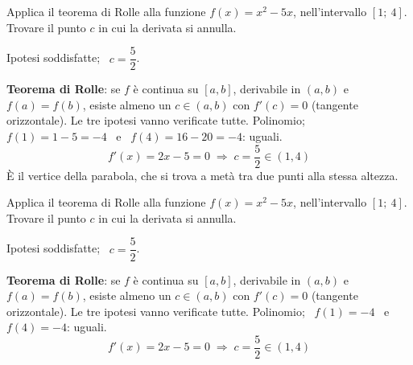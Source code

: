 
\begin{question}[ID=1.5, subtitle={Teorema di Rolle per $f(x)=x^2-5x$ su $[1,4]$}, tags={rolle, teoremi}, difficulty=facile]
Applica il teorema di Rolle alla funzione \(f(x) = x^2 - 5x\), nell'intervallo \([1;\ 4]\). Trovare il punto \(c\) in cui la derivata si annulla.
\begin{solution}
Ipotesi soddisfatte; \ $c=\dfrac52$.
\end{solution}
\begin{explanation}
\textbf{Teorema di Rolle}: se $f$ è continua su $[a,b]$, derivabile in $(a,b)$ e $f(a)=f(b)$, esiste almeno un $c\in(a,b)$ con $f'(c)=0$ (tangente orizzontale). Le tre ipotesi vanno verificate tutte.
Polinomio; \ $f(1)=1-5=-4$ \ e \ $f(4)=16-20=-4$: uguali.
\[ f'(x)=2x-5=0 \;\Rightarrow\; c=\dfrac52\in(1,4) \]
È il vertice della parabola, che si trova a metà tra due punti alla stessa altezza.
\end{explanation}
\end{question}


\begin{question}[ID=1.6, subtitle={Teorema di Rolle per $f(x)=x^2-5x$ su $[1,4]$ — variante}, tags={rolle, teoremi}, difficulty=facile]
Applica il teorema di Rolle alla funzione \(f(x) = x^2 - 5x\), nell'intervallo \([1;\ 4]\). Trovare il punto \(c\) in cui la derivata si annulla.
\begin{solution}
Ipotesi soddisfatte; \ $c=\dfrac52$.
\end{solution}
\begin{explanation}
\textbf{Teorema di Rolle}: se $f$ è continua su $[a,b]$, derivabile in $(a,b)$ e $f(a)=f(b)$, esiste almeno un $c\in(a,b)$ con $f'(c)=0$ (tangente orizzontale). Le tre ipotesi vanno verificate tutte.
Polinomio; \ $f(1)=-4$ \ e \ $f(4)=-4$: uguali.
\[ f'(x)=2x-5=0 \;\Rightarrow\; c=\dfrac52\in(1,4) \]
\end{explanation}
\end{question}


